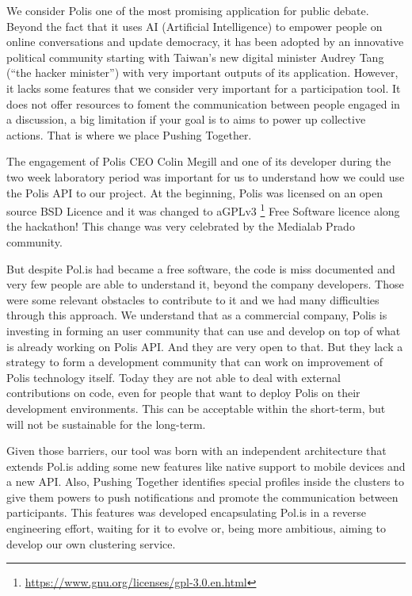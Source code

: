 \documentclass{llncs}
\begin{document}
  We consider Polis one of the most promising application for public debate.
Beyond the fact that it uses AI (Artificial Intelligence) to empower people
on online conversations and update democracy, it has been adopted by an
innovative political community starting with Taiwan's new digital minister
Audrey Tang (“the hacker minister”) with very important outputs of its
application. However, it lacks some features that we consider very important
for a participation tool. It does not offer resources to foment the
communication between people engaged in a discussion, a big limitation if your
goal is to aims to power up collective actions. That is where we place Pushing
Together.

  The engagement of Polis CEO Colin Megill and one of its developer during the
two week laboratory period was important for us to understand how we could use
the Polis API to our project. At the beginning, Polis was licensed on an open
source BSD Licence and it was changed to
aGPLv3 \footnote{\url{https://www.gnu.org/licenses/gpl-3.0.en.html}}
Free Software licence along the hackathon! This change was very celebrated by
the Medialab Prado community.

  But despite Pol.is had became a free software, the code is miss documented and
very few people are able to understand it, beyond the company developers. Those
were some relevant obstacles to contribute to it and we had many  difficulties
through this approach. We understand that as a commercial company, Polis is
investing in forming an user community that can use and develop on top of what
is already working on Polis API. And they are very open to that. But they lack
a strategy to form a development community that can work on improvement of
Polis technology itself. Today they are not able to deal with external
contributions on code, even for people that want to deploy Polis on their
development environments. This can be acceptable within the short-term, but
will not be sustainable for the long-term.

  Given those barriers, our tool was born with an independent architecture
that extends Pol.is adding some new features like native support to mobile
devices and a new API. Also, Pushing Together identifies special profiles
inside the clusters to give them powers to push notifications and promote the
communication between participants. This features was developed encapsulating
Pol.is in a reverse engineering effort, waiting for it to evolve or, being more
ambitious, aiming to develop our own clustering service.
\end{document}
